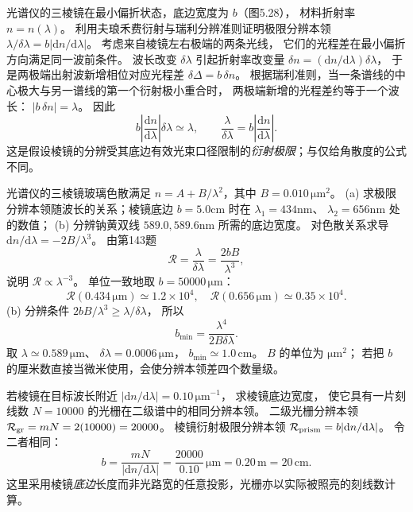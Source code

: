 光谱仪的三棱镜在最小偏折状态，底边宽度为 $b$（图5.28），
材料折射率 $n=n(\lambda)$。
利用夫琅禾费衍射与瑞利分辨准则证明极限分辨本领
$\lambda/\delta\lambda=b|\mathrm dn/\mathrm d\lambda|$。
\exsolution
考虑来自棱镜左右极端的两条光线，
它们的光程差在最小偏折方向满足同一波前条件。
波长改变 $\delta\lambda$ 引起折射率改变量
$\delta n=(\mathrm dn/\mathrm d\lambda)\delta\lambda$，
于是两极端出射波新增相位对应光程差
$\delta\Delta=b\,\delta n$。
根据瑞利准则，当一条谱线的中心极大与另一谱线的第一个衍射极小重合时，
两极端新增的光程差约等于一个波长：
$|b\,\delta n|=\lambda$。
因此
\[
b\left|\frac{\mathrm dn}{\mathrm d\lambda}\right|
\delta\lambda\simeq\lambda,
\qquad
\boxed{\frac{\lambda}{\delta\lambda}
=b\left|\frac{\mathrm dn}{\mathrm d\lambda}\right|}.
\]
\excheck 这是假设棱镜的分辨受其底边有效光束口径限制的\emph{衍射极限}；与仅给角散度的公式不同。

光谱仪的三棱镜玻璃色散满足
$n=A+B/\lambda^2$，其中
$B=0.010\,\mathrm{\mu m^2}$。
(a) 求极限分辨本领随波长的关系；棱镜底边
$b=5.0$cm 时在
$\lambda_1=434$nm、
$\lambda_2=656$nm 处的数值；
(b) 分辨钠黄双线
$589.0,589.6$nm 所需的底边宽度。
\exsolution
对色散关系求导
$\mathrm dn/\mathrm d\lambda=-2B/\lambda^3$。
由第143题
\[
\boxed{\mathcal R=\frac{\lambda}{\delta\lambda}
=\frac{2bB}{\lambda^3}},
\]
说明 $\mathcal R\propto\lambda^{-3}$。
单位一致地取 $b=50000\,\mathrm{\mu m}$：
\[
\boxed{\mathcal R(0.434\,\mathrm{\mu m})
\simeq1.2\times10^4},\quad
\boxed{\mathcal R(0.656\,\mathrm{\mu m})
\simeq0.35\times10^4}.
\]
(b) 分辨条件
$2bB/\lambda^3\ge\lambda/\delta\lambda$，
所以
\[
\boxed{b_{\min}=
\frac{\lambda^4}{2B\delta\lambda}}.
\]
取 $\lambda\simeq0.589\,\mathrm{\mu m}$、
$\delta\lambda=0.0006\,\mathrm{\mu m}$，
$\boxed{b_{\min}\simeq1.0\,\mathrm{cm}}$。
\excheck $B$ 的单位为 $\mathrm{\mu m^2}$；
若把 $b$ 的厘米数直接当微米使用，会使分辨本领差四个数量级。

若棱镜在目标波长附近
$|\mathrm dn/\mathrm d\lambda|
=0.10\,\mathrm{\mu m^{-1}}$，
求棱镜底边宽度，
使它具有一片刻线数
$N=10000$ 的光栅在二级谱中的相同分辨本领。
\exsolution
二级光栅分辨本领
$\mathcal R_{\rm gr}=mN=2(10000)=20000$。
棱镜衍射极限分辨本领
$\mathcal R_{\rm prism}=b|\mathrm dn/\mathrm d\lambda|$。
令二者相同：
\[
\boxed{b=
\frac{mN}{|\mathrm dn/\mathrm d\lambda|}
=\frac{20000}{0.10}\,\mathrm{\mu m}
=0.20\,\mathrm m=20\,\mathrm{cm}}.
\]
\excheck 这里采用棱镜\emph{底边}长度而非光路宽的任意投影，光栅亦以实际被照亮的刻线数计算。

